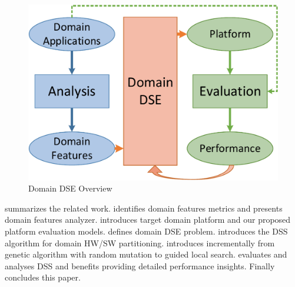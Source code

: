 
\begin{figure}[h]
	\centering
	\includegraphics[width=.65\linewidth]{fig/Overview.pdf}
	\caption{Domain DSE Overview}
	\label{fig:overview}
\end{figure}

   summarizes the related work.  identifies domain features metrics and presents domain features analyzer.  introduces target domain platform and our proposed platform evaluation models.  defines domain DSE problem.  introduces the DSS algorithm for domain HW/SW partitioning.  introduces \ga incrementally from genetic algorithm with random mutation to guided local search.   evaluates and analyses DSS and \ga benefits providing detailed performance insights. 
Finally  concludes this paper. 